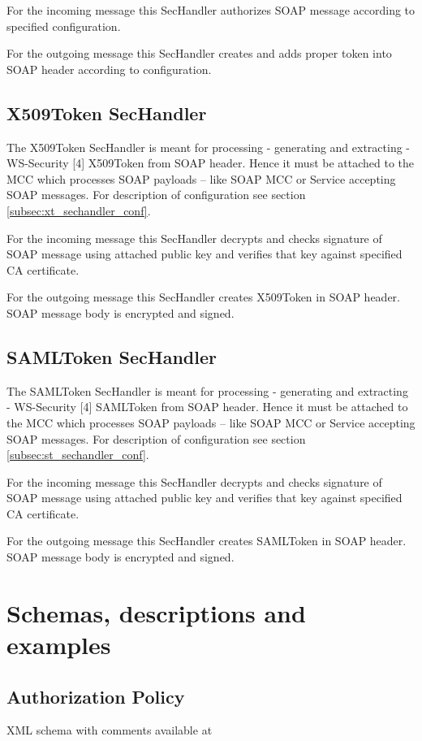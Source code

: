 \documentclass{article}                            %
\begin{document}
For the incoming message this SecHandler authorizes SOAP message according to specified configuration.

For the outgoing message this SecHandler creates and adds proper token into SOAP header according to configuration.

\subsection{X509Token SecHandler} %
\label{subsec:x509_token}
The X509Token SecHandler is meant for processing - generating and extracting - WS-Security [4] X509Token from SOAP header. Hence it must be attached to the MCC which processes SOAP payloads – like SOAP MCC or Service accepting SOAP messages. For description of configuration see section \ref{subsec:xt_sechandler_conf}.

For the incoming message this SecHandler decrypts and checks signature of SOAP message using attached public key and verifies that key against specified CA certificate.

For the outgoing message this SecHandler creates X509Token in SOAP header. SOAP message body is encrypted and signed.

\subsection{SAMLToken SecHandler} %
\label{subsec:saml_token}
The SAMLToken SecHandler is meant for processing - generating and extracting - WS-Security [4] SAMLToken from SOAP header. Hence it must be attached to the MCC which processes SOAP payloads – like SOAP MCC or Service accepting SOAP messages. For description of configuration see section \ref{subsec:st_sechandler_conf}.

For the incoming message this SecHandler decrypts and checks signature of SOAP message using attached public key and verifies that key against specified CA certificate.

For the outgoing message this SecHandler creates SAMLToken in SOAP header. SOAP message body is encrypted and signed.




\section{Schemas, descriptions and examples} %
\label{sec:schema_description_example}

\subsection{Authorization Policy} %
\label{subsec:authz_policy}
XML schema with comments available at
\end{document}
